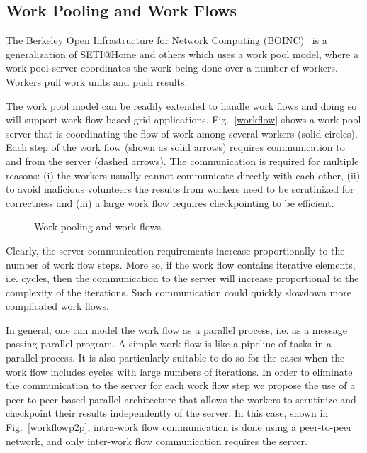 \documentclass[times, 12pt, onecolumn]{article}
\newcommand{\reffig}[1]{Fig.~\ref{#1}}
\begin{document}
\subsection{Work Pooling and Work Flows}

The Berkeley Open Infrastructure for Network Computing (BOINC)~\cite{anderson04} is a
generalization of SETI@Home and others which uses a work pool model, where a
work pool server coordinates the work being done over a number of workers.
Workers pull work units and push results. 

The work pool model can be readily extended to handle work flows and doing so
will support work flow based grid applications. \reffig{workflow} shows a work
pool server that is coordinating the flow of work among several workers (solid
circles). Each step of the work flow (shown as solid arrows) requires
communication to and from the server (dashed arrows). The communication is
required for multiple reasons: (i) the workers usually cannot communicate
directly with each other, (ii) to avoid malicious volunteers the results from
workers need to be scrutinized for correctness and (iii) a large work flow
requires checkpointing to be efficient.

\begin{figure}
\centering
{}
\hspace{1cm}
\caption{Work pooling and work flows.}
\label{workflowfig}
\end{figure}


Clearly, the server communication requirements increase proportionally to the
number of work flow steps. More so, if the work flow contains iterative
elements, i.e. cycles, then the communication to the server will increase
proportional to the complexity of the iterations. Such communication could
quickly slowdown more complicated work flows.

In general, one can model the work flow as a parallel process, i.e. as a
message passing parallel program. A simple work flow is like a pipeline of
tasks in a parallel process. It is also particularly suitable to do so for the
cases when the work flow includes cycles with large numbers of iterations.  In
order to eliminate the communication to the server for each work flow step we
propose the use of a peer-to-peer based parallel architecture that allows the
workers to scrutinize and checkpoint their results independently of the server.
In this case, shown in \reffig{workflowp2p}, intra-work flow communication is
done using a peer-to-peer network, and only inter-work flow communication
requires the server.
\end{document}
